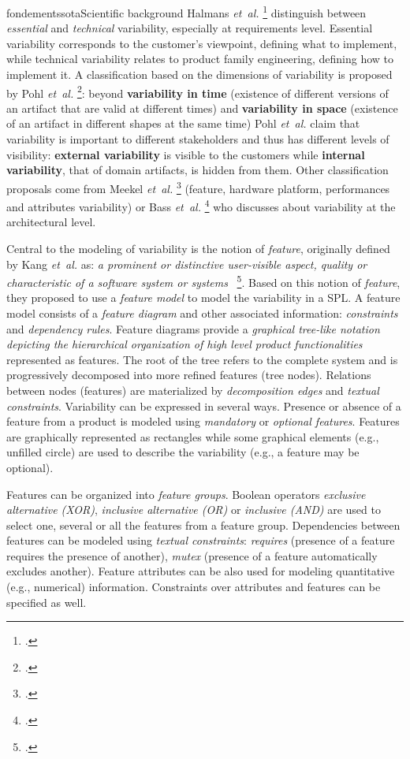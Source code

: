 \documentclass{ra2018}
\begin{document}
\begin{module}{fondements}{sota}{Scientific background}
Halmans \textit{et~al.}   \footcite{halmans2003} distinguish between \textit{essential} and
\textit{technical} variability, especially at requirements level. Essential
variability corresponds to the customer's viewpoint, defining what to
implement, while technical variability relates to product family engineering,
defining how to implement it. A classification based on the dimensions of
variability is proposed by Pohl \textit{et~al.}   \footcite{Pohl2005}: beyond
\textbf{variability in time} (existence of different versions of an artifact
that are valid at different times) and \textbf{variability in space}
(existence of an artifact in different shapes at the same time) Pohl \textit{et~al.} claim that variability is important to different stakeholders and thus has
different levels of visibility: \textbf{external variability} is visible to
the customers while \textbf{internal variability}, that of domain artifacts,
is hidden from them. Other classification proposals come from Meekel \textit{et~al.}   \footcite{Meekel1998} (feature, hardware platform, performances and attributes
variability) or Bass \textit{et~al.}   \footcite{Bachmann2001} who discusses about variability
at the architectural level.


Central to the modeling of variability is the notion of \textit{feature},
originally defined by Kang \textit{et~al.} as: \textit{a prominent or distinctive user-visible
aspect, quality or characteristic of a software system or
systems}~  \footcite{Kang1990}. Based on this notion of \textit{feature}, they proposed to use a
\textit{feature model} to model the variability in a SPL. A
feature model consists of a \textit{feature diagram} and other associated
information: \textit{constraints} and \textit{dependency rules}. Feature
diagrams provide a \textit{graphical tree-like notation depicting the
hierarchical organization of high level product functionalities} represented
as features. The root of the tree refers to the complete system and is
progressively decomposed into more refined features (tree nodes). Relations
between nodes (features) are materialized by \textit{decomposition edges} and
\textit{textual constraints}. Variability can be expressed in several
ways. Presence or absence of a feature from a product is modeled using
\textit{mandatory} or \textit{optional features}. Features are graphically
represented as rectangles while some graphical elements (e.g., unfilled
circle) are used to describe the variability (e.g., a feature may be
optional).

Features can be organized into \textit{feature groups}. Boolean operators
\textit{exclusive alternative (XOR)}, \textit{inclusive alternative (OR)} or
\textit{inclusive (AND)} are used to select one, several or all the features
from a feature group. Dependencies between features can be modeled using
\textit{textual constraints}: \textit{requires} (presence of a feature requires
the presence of another), \textit{mutex} (presence of a feature automatically
excludes another). Feature attributes can be also used for modeling quantitative (e.g., numerical) information. 
Constraints over attributes and features can be specified as well. 


\end{module}
\end{document}
